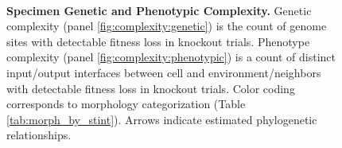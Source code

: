 \begin{figure}
\begin{minipage}{\linewidth}
\centering
\begin{minipage}[t]{0.48\linewidth}
\label{fig:complexity:genetic}
\end{minipage}
~~
\begin{minipage}[t]{0.48\linewidth}
\label{fig:complexity:phenotypic}
\end{minipage}
\end{minipage}

\caption{%
\textbf{Specimen Genetic and Phenotypic Complexity.}
Genetic complexity (panel \ref{fig:complexity:genetic}) is the count of genome sites with detectable fitness loss in knockout trials.
Phenotype complexity (panel \ref{fig:complexity:phenotypic}) is a count of distinct input/output interfaces between cell and environment/neighbors with detectable fitness loss in knockout trials.
Color coding corresponds to morphology categorization (Table \ref{tab:morph_by_stint}).
Arrows indicate estimated phylogenetic relationships.
}
\label{fig:complexity}
\end{figure}
